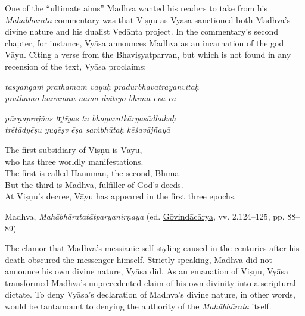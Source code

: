 One of the “ultimate aims” Madhva wanted his readers to take from his \emph{Mahābhārata} commentary was that Viṣṇu-as-Vyāsa sanctioned both Madhva’s divine nature and his dualist Vedānta project. In the commentary’s second chapter, for instance, Vyāsa announces Madhva as an incarnation of the god Vāyu. Citing a verse from the Bhaviṣyatparvan, but which is not found in any recension of the text, Vyāsa proclaims:

\begin{pullquote}\raggedright
      \emph{tasyāṅgaṁ prathamaṁ vāyuḥ prādurbhāvatrayānvitaḥ}\\
\emph{prathamō hanumān nāma dvitīyō bhīma ēva ca}

\emph{pūrṇaprajñas tr̥tīyas tu bhagavatkāryasādhakaḥ}\\
\emph{trētādyēṣu yugēṣv ēṣa saṁbhūtaḥ kēśavājñayā}
\end{pullquote}
      
\begin{pullquote}


	
	      The first subsidiary of Viṣṇu is Vāyu,\\
	      who has three worldly manifestations.\\
	      The first is called Hanumān, the second, Bhīma.\\
	      But the third is Madhva, fulfiller of God’s deeds.\\
	      At Viṣṇu’s decree, Vāyu has appeared in the first three epochs.\footnotemark{}
	    \\


\medskip\hfill\begin{minipage}{0.9\textwidth}\small\hfill
Madhva, \emph{{Mahābhāratatātparyanirṇaya}} (ed. \hyperref[Madhva2009]{Gōvindācārya}, vv. 2.124–125, pp. 88–89)\end{minipage}\hspace{2em}
\end{pullquote}

The clamor that Madhva’s messianic self-styling caused in the centuries after his death obscured the messenger himself. Strictly speaking, Madhva did not announce his own divine nature, Vyāsa did. As an emanation of Viṣṇu, Vyāsa transformed Madhva’s unprecedented claim of his own divinity into a scriptural dictate. To deny Vyāsa’s declaration of Madhva’s divine nature, in other words, would be tantamount to denying the authority of the \emph{Mahābhārata} itself.


